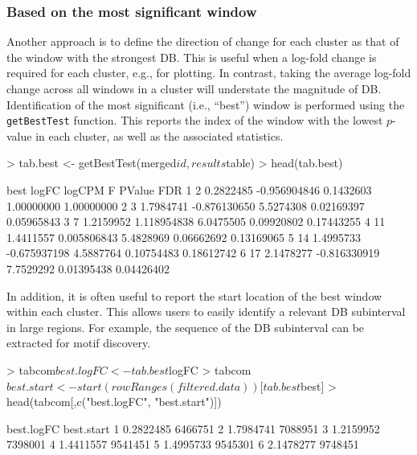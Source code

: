 \documentclass[12pt]{report}
\renewenvironment{Schunk}{\vspace{0pt}}{\vspace{0pt}}
\newcommand{\code}[1]{{\small\texttt{#1}}}
\begin{document}
\subsubsection{Based on the most significant window}
Another approach is to define the direction of change for each cluster as that of the window with the strongest DB.
This is useful when a log-fold change is required for each cluster, e.g., for plotting.
In contrast, taking the average log-fold change across all windows in a cluster will understate the magnitude of DB.
Identification of the most significant (i.e., ``best'') window is performed using the \code{getBestTest} function.
This reports the index of the window with the lowest $p$-value in each cluster, as well as the associated statistics.

\begin{Schunk}
\begin{Sinput}
> tab.best <- getBestTest(merged$id, results$table)
> head(tab.best)
\end{Sinput}
\begin{Soutput}
  best     logFC       logCPM         F     PValue        FDR
1    2 0.2822485 -0.956904846 0.1432603 1.00000000 1.00000000
2    3 1.7984741 -0.876130650 5.5274308 0.02169397 0.05965843
3    7 1.2159952  1.118954838 6.0475505 0.09920802 0.17443255
4   11 1.4411557  0.005806843 5.4828969 0.06662692 0.13169065
5   14 1.4995733 -0.675937198 4.5887764 0.10754483 0.18612742
6   17 2.1478277 -0.816330919 7.7529292 0.01395438 0.04426402
\end{Soutput}
\end{Schunk}

In addition, it is often useful to report the start location of the best window within each cluster.
This allows users to easily identify a relevant DB subinterval in large regions.
For example, the sequence of the DB subinterval can be extracted for motif discovery.

\begin{Schunk}
\begin{Sinput}
> tabcom$best.logFC <- tab.best$logFC
> tabcom$best.start <- start(rowRanges(filtered.data))[tab.best$best]
> head(tabcom[,c("best.logFC", "best.start")])
\end{Sinput}
\begin{Soutput}
  best.logFC best.start
1  0.2822485    6466751
2  1.7984741    7088951
3  1.2159952    7398001
4  1.4411557    9541451
5  1.4995733    9545301
6  2.1478277    9748451
\end{Soutput}
\end{Schunk}
\end{document}
